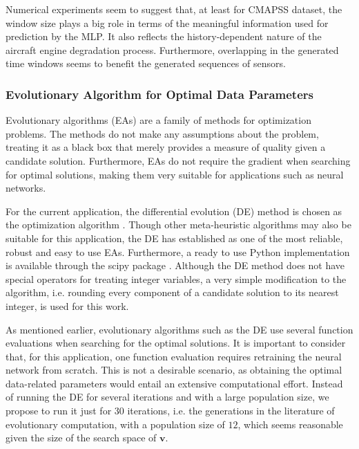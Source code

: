\documentclass[preprint,12pt]{elsarticle}%
\begin{document}
Numerical experiments seem to suggest that, at least for CMAPSS dataset, the window size plays a big role in terms of the meaningful information used for prediction by the MLP. It also reflects the history-dependent nature of the aircraft engine degradation process. Furthermore, overlapping in the generated time windows seems to benefit the generated sequences of sensors.

\subsubsection{Evolutionary Algorithm for Optimal Data Parameters}

\label{sec:ea_optimization_process}

Evolutionary algorithms (EAs) are a family of methods for optimization problems. The methods do not make any assumptions about the problem, treating it as a black box that merely provides a measure of quality given a candidate solution. Furthermore, EAs do not require the gradient when searching for optimal solutions, making them very suitable for applications such as neural networks.

For the current application, the differential evolution (DE) method is chosen as the optimization algorithm \cite{Storn1997}. Though other meta-heuristic algorithms may also be suitable for this application, the DE has established as one of the most reliable, robust and easy to use EAs. Furthermore, a ready to use Python implementation is available through the scipy package \cite{scipy}. Although the DE method does not have special operators for treating integer variables, a very simple modification to the algorithm, i.e. rounding every component of a candidate solution to its nearest integer, is used for this work.

As mentioned earlier, evolutionary algorithms such as the DE use several function evaluations when searching for the optimal solutions. It is important to consider that, for this application, one function evaluation requires retraining the neural network from scratch. This is not a desirable scenario, as obtaining the optimal data-related parameters would entail an extensive computational effort. Instead of running the DE for several iterations and with a large population size, we propose to run it just for $30$ iterations, i.e. the generations in the literature of evolutionary computation, with a population size of $12$, which seems reasonable given the size of the search space of $\mathbf{v}$.
\end{document}
